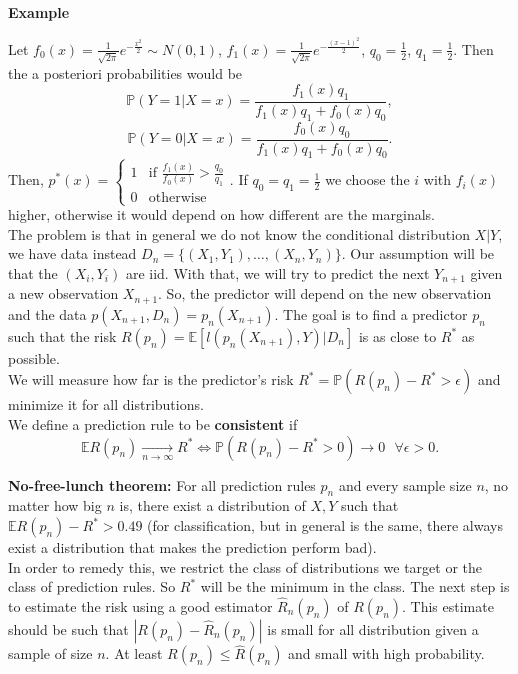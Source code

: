 \documentclass[11pt, english]{article}
\begin{document}
\textbf{Example\\}

Let $f_0(x)=\frac{1}{\sqrt{2\pi}}e^{-\frac{x^2}{2}}\sim N(0,1)$, $f_1(x)=\frac{1}{\sqrt{2\pi}}e^{-\frac{(x-1)^2}{2}}$, $q_0=\frac{1}{2}$, $q_1=\frac{1}{2}$. Then the a posteriori probabilities would be
$$\mathbb{P}(Y=1|X=x)=\frac{f_1(x)q_1}{f_1(x)q_1+f_0(x)q_0},$$
$$\mathbb{P}(Y=0|X=x)=\frac{f_0(x)q_0}{f_1(x)q_1+f_0(x)q_0}.$$
Then, $p^*(x)=\left\{\begin{array}{ll}
1 & \text{if }\frac{f_1(x)}{f_0(x)}>\frac{q_0}{q_1}\\
0 & \text{otherwise}
\end{array}\right.$. If $q_0=q_1=\frac{1}{2}$ we choose the $i$ with $f_i(x)$ higher, otherwise it would depend on how different are the marginals.\\

The problem is that in general we do not know the conditional distribution $X|Y$, we have data instead $D_n=\{(X_1,Y_1),\dots,(X_n,Y_n)\}$. Our assumption will be that the $(X_i,Y_i)$ are iid. With that, we will try to predict the next $Y_{n+1}$ given a new observation $X_{n+1}$. So, the predictor will depend on the new observation and the data $p(X_{n+1},D_n)=p_n(X_{n+1})$. The goal is to find a predictor $p_n$ such that the risk $R(p_n)=\mathbb{E}[l(p_n(X_{n+1}),Y)|D_n]$ is as close to $R^*$ as possible. \\
We will measure how far is the predictor's risk $R^* = \mathbb{P}(R(p_n)-R^*>\epsilon)$ and minimize it for all distributions.\\

We define a prediction rule to be \textbf{consistent} if $$\mathbb{E}R(p_n)\underset{n\rightarrow\infty}{\longrightarrow} R^*\Leftrightarrow \mathbb{P}(R(p_n)-R^*>0)\rightarrow 0\text{ }\forall \epsilon>0.$$

\textbf{No-free-lunch theorem:} For all prediction rules $p_n$ and every sample size $n$, no matter how big $n$ is, there exist a distribution of $X,Y$ such that $\mathbb{E}R(p_n)-R^*>0.49$ (for classification, but in general is the same, there always exist a distribution that makes the prediction perform bad). \\

In order to remedy this, we restrict the class of distributions we target or the class of prediction rules. So $R^*$ will be the minimum in the class. The next step is to estimate the risk using a good estimator $\hat{R}_n(p_n)$ of $R(p_n)$. This estimate should be such that $|R(p_n)-\hat{R}_n(p_n)|$ is small for all distribution given a sample of size $n$. At least $R(p_n)\leq \hat{R}(p_n)$ and small with high probability.
\end{document}
